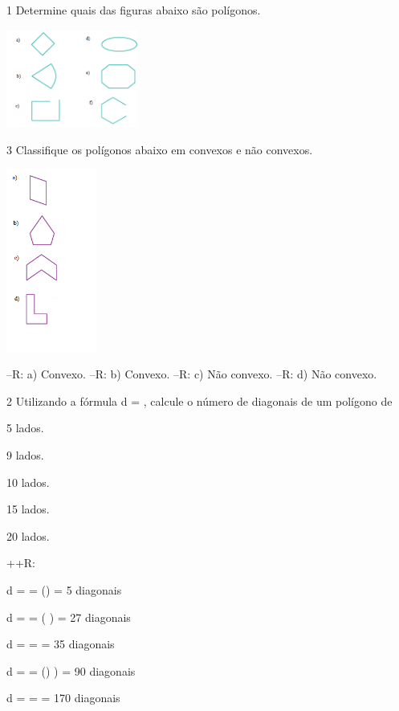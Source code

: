 {\num{1} Determine quais das figuras abaixo são polígonos.

\includegraphics[width=1.7in,height=1.26763in]{./imgSAEB_8_MAT/media/image7.png}


\num{3} Classifique os polígonos abaixo em convexos e não convexos.

\includegraphics[width=1.16236in,height=2.36667in]{./imgSAEB_8_MAT/media/image8.png}

--R: a) Convexo.
--R: b) Convexo.
--R: c) Não convexo.
--R: d) Não convexo.

\num{2} Utilizando a fórmula d = , calcule o número
de diagonais de um polígono de
\item 5 lados.
\item 9 lados.
\item 10 lados.
\item 15 lados.
\item 20 lados.

++R:
\item d =  = ()
 = 5 diagonais
\item d =  = (
) = 27 diagonais
\item d =  = 
 = 35 diagonais
\item d =  = ()
) = 90 diagonais
\item d =  = 
 = 170 diagonais

}
